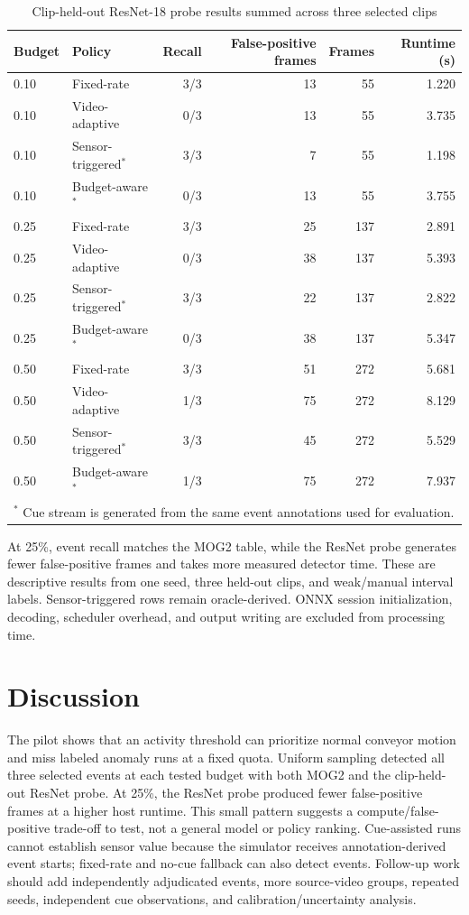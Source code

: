 \documentclass[conference]{IEEEtran}
\begin{document}
\begin{table}[t]
\caption{Clip-held-out ResNet-18 probe results summed across three selected clips}
\label{tab:resnet}
\centering
\scriptsize
\setlength{\tabcolsep}{5pt}
\begin{tabular}{llrrrr}
\hline
Budget & Policy & Recall & False-positive frames & Frames & Runtime (s) \\
\hline
0.10 & Fixed-rate & 3/3 & 13 & 55 & 1.220 \\
0.10 & Video-adaptive & 0/3 & 13 & 55 & 3.735 \\
0.10 & Sensor-triggered$^{*}$ & 3/3 & 7 & 55 & 1.198 \\
0.10 & Budget-aware$^{*}$ & 0/3 & 13 & 55 & 3.755 \\
0.25 & Fixed-rate & 3/3 & 25 & 137 & 2.891 \\
0.25 & Video-adaptive & 0/3 & 38 & 137 & 5.393 \\
0.25 & Sensor-triggered$^{*}$ & 3/3 & 22 & 137 & 2.822 \\
0.25 & Budget-aware$^{*}$ & 0/3 & 38 & 137 & 5.347 \\
0.50 & Fixed-rate & 3/3 & 51 & 272 & 5.681 \\
0.50 & Video-adaptive & 1/3 & 75 & 272 & 8.129 \\
0.50 & Sensor-triggered$^{*}$ & 3/3 & 45 & 272 & 5.529 \\
0.50 & Budget-aware$^{*}$ & 1/3 & 75 & 272 & 7.937 \\
\hline
\multicolumn{6}{l}{$^{*}$ Cue stream is generated from the same event annotations used for evaluation.}
\end{tabular}
\end{table}

At 25\%, event recall matches the MOG2 table, while the ResNet probe generates fewer false-positive frames and takes more measured detector time. These are descriptive results from one seed, three held-out clips, and weak/manual interval labels. Sensor-triggered rows remain oracle-derived. ONNX session initialization, decoding, scheduler overhead, and output writing are excluded from processing time.

\section{Discussion}
The pilot shows that an activity threshold can prioritize normal conveyor motion and miss labeled anomaly runs at a fixed quota. Uniform sampling detected all three selected events at each tested budget with both MOG2 and the clip-held-out ResNet probe. At 25\%, the ResNet probe produced fewer false-positive frames at a higher host runtime. This small pattern suggests a compute/false-positive trade-off to test, not a general model or policy ranking. Cue-assisted runs cannot establish sensor value because the simulator receives annotation-derived event starts; fixed-rate and no-cue fallback can also detect events. Follow-up work should add independently adjudicated events, more source-video groups, repeated seeds, independent cue observations, and calibration/uncertainty analysis.
\end{document}
